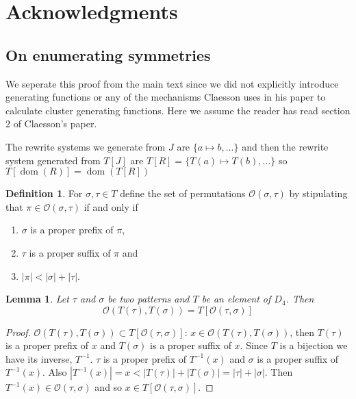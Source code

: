 \documentclass[a4paper, 11pt, english]{article}
\newcommand{\patternrule}{ \mapsto \!}
\newtheorem{lemma}[theorem]{Lemma}
\theoremstyle{definition}
\newtheorem{definition}[theorem]{Definition}
\newcommand{\Ocal}{\mathcal{O}}
\DeclareMathOperator{\dom}{dom}
\begin{document}
\section*{Acknowledgments}




\clearpage

\begin{appendices}
\section{On enumerating symmetries}
We seperate this proof from the main text since we did not explicitly introduce
generating functions or any of the mechanisms Claesson uses in his paper to
calculate cluster generating functions. Here we assume the reader has read
section 2 of Claesson's paper.

The rewrite systems we generate from $J$ are $\{ a \patternrule b, \dots \}$
and then the rewrite system generated from $T[J]$ are $T[R]=\{ T(a) \patternrule T(b), \dots \}$
so $T[\dom(R)]=\dom(T[R])$

\begin{definition}
    For $\sigma, \tau \in T$ define the set of permutations $\Ocal(\sigma,
    \tau)$ by stipulating that $\pi \in \Ocal(\sigma, \tau)$ if and only if
    \begin{enumerate}
    \item $\sigma$ is a proper prefix of $\pi$,
    \item $\tau$ is a proper suffix of $\pi$ and
    \item $|\pi| < |\sigma| + |\tau|$.
    \end{enumerate}
\end{definition}

\begin{lemma}
Let $\tau$ and $\sigma$ be two patterns and $T$ be an element of $D_4$.
Then 
\[
    \Ocal(T(\tau), T(\sigma)) = T[\Ocal(\tau, \sigma)]
\]
\end{lemma}
\begin{proof}
    $\Ocal(T(\tau), T(\sigma)) \subset T[\Ocal(\tau, \sigma)]$: 
    $x \in \Ocal(T(\tau), T(\sigma))$, then $T(\tau)$ is a proper prefix of
    $x$ and $T(\sigma)$ is a proper suffix of $x$. Since $T$ is a bijection we
    have its inverse, $T^{-1}$. $\tau$ is a proper prefix of $T^{-1}(x)$ and 
    $\sigma$ is a proper suffix of $T^{-1}(x)$. Also $|T^{-1}(x)| = x <
    |T(\tau)| + |T(\sigma)| = |\tau| + |\sigma|$. Then $T^{-1}(x) \in \Ocal(\tau,
    \sigma)$ and so $x \in T[\Ocal(\tau, \sigma)]$.


\end{proof}
\end{appendices}
\end{document}
